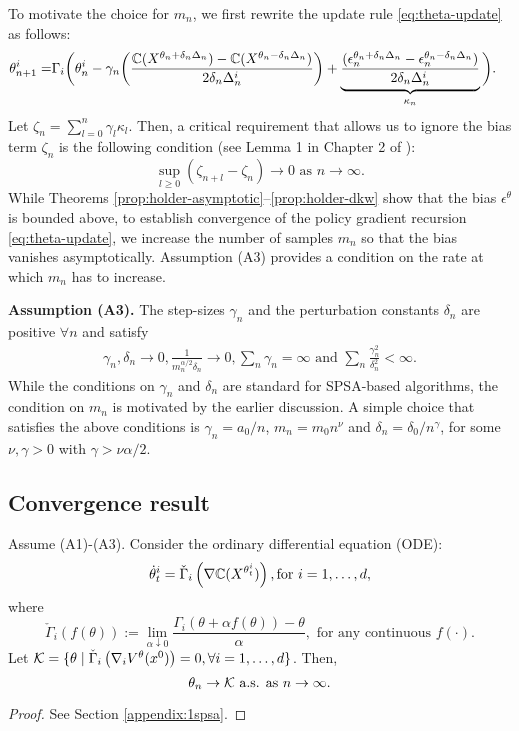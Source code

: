 \documentclass[11pt,letterpaper,english]{article}
\begin{document}
To motivate the choice for $m_n$, we first rewrite the update rule \eqref{eq:theta-update} as follows:
\begin{align*}
\theta^{i}_{n+1}  = & \Gamma_{i}\bigg( \theta^{i}_n -  \gamma_n \bigg( \frac{\mathbb{C}(X^{\theta_n +\delta_n\Delta_n}) - \mathbb{C}(X^{\theta_n-\delta_n\Delta_n})}{2\delta_n\Delta_n^{i}}\bigg) + \underbrace{\frac{(\epsilon_n^{\theta_n +\delta_n\Delta_n} - \epsilon_n^{\theta_n-\delta_n\Delta_n})}{2\delta_n\Delta_n^{i}}}_{\kappa_n}\bigg).
\end{align*}
Let $\zeta_n = \sum_{l = 0}^{n} \gamma_l \kappa_{l}$. Then, a critical requirement that allows us to ignore the bias term $\zeta_n$ is the following condition (see Lemma 1 in Chapter 2 of \cite{borkar2008stochastic}): 
$$\sup_{l\ge0} \left (\zeta_{n+l} - \zeta_n \right) \rightarrow 0 \text{ as } n\rightarrow\infty.$$ 
While Theorems \ref{prop:holder-asymptotic}--\ref{prop:holder-dkw} show that the bias $\epsilon^\theta$ is bounded above, to establish convergence of the policy gradient recursion \eqref{eq:theta-update}, we increase the number of samples $m_n$ so that the bias vanishes asymptotically.  Assumption (A3) provides a condition on the rate at which $m_n$ has to increase.

\noindent\textbf{Assumption (A3).}  The step-sizes $\gamma_n$ and the perturbation constants 
$\delta_n$ are positive $\forall n$ and satisfy
\begin{align*}
\gamma_n, \delta_n \rightarrow 0, \frac{1}{m_n^{\alpha/2}\delta_n}\rightarrow 0,  \sum_n \gamma_n=\infty \text{ and } \sum_n \frac{\gamma_n^2}{\delta_n^2}<\infty. 
\end{align*}
While the conditions on $\gamma_n$ and $\delta_n$ are standard for SPSA-based algorithms, the condition on $m_n$ is motivated by the earlier discussion. 
A simple choice that satisfies the above conditions is $\gamma_n = a_0/n$, $m_n = m_0 n^\nu$ and $\delta_n = \delta_0/{n^\gamma}$, for some $\nu, \gamma >0$ with $\gamma > \nu\alpha/2$.

\subsection{Convergence result}
\begin{theorem}
\label{thm:1spsa-conv}
Assume (A1)-(A3).
Consider the  ordinary differential equation (ODE): 
$$\dot\theta^{i}_t = \check\Gamma_{i}\left( \nabla \mathbb{C}(X^{\theta^{i}_t})\right), \text{for }i=1,\dots,d,$$ 
where 
$$\check\Gamma_{i}(f(\theta)) := \lim\limits_{\alpha \downarrow 0} \frac{\Gamma_{i}(\theta + \alpha f(\theta)) - \theta}{\alpha}, \textrm{ for any continuous }f(\cdot).$$
 Let $\mathcal{K} = \{\theta \mid \check\Gamma_{i} \left(\nabla_i V^{\theta}(x^0)\right)=0, \forall i=1,\ldots,d\}$. Then,
$$\theta_n \rightarrow \mathcal{K} \text{ a.s. as } n\rightarrow \infty.$$
\end{theorem}
\begin{proof}
 See Section \ref{appendix:1spsa}.
\end{proof}
\end{document}

